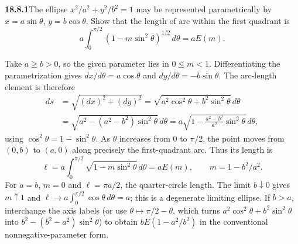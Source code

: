 \par\bigskip
\noindent\textbf{18.8.1}\quad The ellipse $x^{2}/a^{2}+y^{2}/b^{2}=1$
may be represented parametrically by $x=a\sin\theta$,
$y=b\cos\theta$. Show that the length of arc within the first
quadrant is
\[
a\int_{0}^{\pi/2}(1-m\sin^{2}\theta)^{1/2}\,d\theta=aE(m).
\]
\par\nobreak
\solution
Take $a\ge b>0$, so the given parameter lies in $0\le m<1$.
Differentiating the parametrization gives
$dx/d\theta=a\cos\theta$ and $dy/d\theta=-b\sin\theta$.
The arc-length element is therefore
\begin{align*}
ds&=\sqrt{(dx)^2+(dy)^2}
 =\sqrt{a^2\cos^2\theta+b^2\sin^2\theta}\,d\theta\\
 &=\sqrt{a^2-(a^2-b^2)\sin^2\theta}\,d\theta
 =a\sqrt{1-\frac{a^2-b^2}{a^2}\sin^2\theta}\,d\theta,
\end{align*}
using $\cos^2\theta=1-\sin^2\theta$.
As $\theta$ increases from $0$ to $\pi/2$, the point moves
from $(0,b)$ to $(a,0)$ along precisely the first-quadrant arc.
Thus its length is
\[
\boxed{\ell=a\int_0^{\pi/2}\sqrt{1-m\sin^2\theta}\,d\theta
              =aE(m)},\qquad m=1-b^2/a^2.
\]
For $a=b$, $m=0$ and $\ell=\pi a/2$, the quarter-circle length.
The limit $b\downarrow0$ gives $m\uparrow1$ and
$\ell\to a\int_0^{\pi/2}\cos\theta\,d\theta=a$;
this is a degenerate limiting ellipse.  If $b>a$, interchange the
axis labels (or use $\theta\mapsto\pi/2-\theta$, which turns
$a^2\cos^2\theta+b^2\sin^2\theta$ into
$b^2-(b^2-a^2)\sin^2\theta$) to obtain
$bE(1-a^2/b^2)$ in the conventional nonnegative-parameter form.

